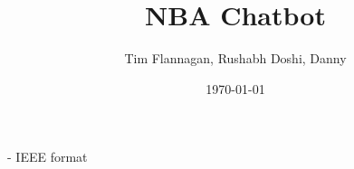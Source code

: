 \documentclass[10pt]{article}
\title{NBA Chatbot}
\author{Tim Flannagan, Rushabh Doshi, Danny}
\date{\today}
\begin{document}
\maketitle
- IEEE format
\end{document}
